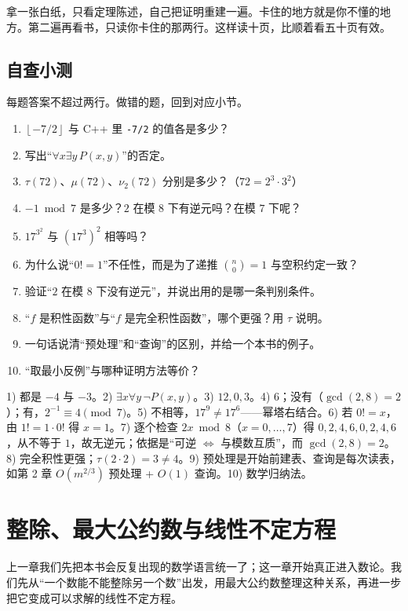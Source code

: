 \documentclass[UTF8,a4paper,11pt,twoside,openright,fontset=fandol]{ctexbook}
\theoremstyle{definition}
\newcommand{\floor}[1]{\left\lfloor #1\right\rfloor}
\begin{document}
\begin{tip}
拿一张白纸，只看定理陈述，自己把证明重建一遍。卡住的地方就是你不懂的地方。第二遍再看书，只读你卡住的那两行。这样读十页，比顺着看五十页有效。
\end{tip}

\section{自查小测}
每题答案不超过两行。做错的题，回到对应小节。

\begin{enumerate}
\item $\floor{-7/2}$ 与 C++ 里 \texttt{-7/2} 的值各是多少？
\item 写出“$\forall x\exists y\,P(x,y)$”的否定。
\item $\tau(72)$、$\mu(72)$、$\nu_2(72)$ 分别是多少？（$72=2^3\cdot3^2$）
\item $-1\bmod 7$ 是多少？$2$ 在模 $8$ 下有逆元吗？在模 $7$ 下呢？
\item $17^{3^{2}}$ 与 $(17^3)^2$ 相等吗？
\item 为什么说“$0!=1$”不任性，而是为了递推 $\binom{n}{0}=1$ 与空积约定一致？
\item 验证“$2$ 在模 $8$ 下没有逆元”，并说出用的是哪一条判别条件。
\item “$f$ 是积性函数”与“$f$ 是完全积性函数”，哪个更强？用 $\tau$ 说明。
\item 一句话说清“预处理”和“查询”的区别，并给一个本书的例子。
\item “取最小反例”与哪种证明方法等价？
\end{enumerate}

\begin{tip}[参考答案]
1) 都是 $-4$ 与 $-3$。2) $\exists x\forall y\,\lnot P(x,y)$。3) $12,0,3$。4) $6$；没有（$\gcd(2,8)=2$）；有，$2^{-1}\equiv4\pmod 7$。5) 不相等，$17^{9}\ne17^{6}$——幂塔右结合。6) 若 $0!=x$，由 $1!=1\cdot0!$ 得 $x=1$。7) 逐个检查 $2x\bmod 8$（$x=0,\ldots,7$）得 $0,2,4,6,0,2,4,6$，从不等于 $1$，故无逆元；依据是“可逆 $\iff$ 与模数互质”，而 $\gcd(2,8)=2$。8) 完全积性更强；$\tau(2\cdot2)=3\ne4$。9) 预处理是开始前建表、查询是每次读表，如第 2 章 $O(m^{2/3})$ 预处理 + $O(1)$ 查询。10) 数学归纳法。
\end{tip}


\chapter{整除、最大公约数与线性不定方程}
\begin{chapterintro}[章节导读]
上一章我们先把本书会反复出现的数学语言统一了；这一章开始真正进入数论。我们先从“一个数能不能整除另一个数”出发，用最大公约数整理这种关系，再进一步把它变成可以求解的线性不定方程。
\end{chapterintro}
\end{document}
